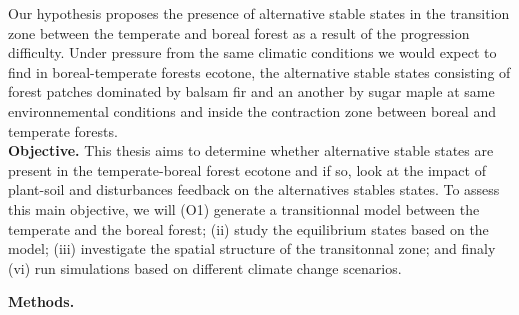 
Our hypothesis proposes the presence of alternative stable states in the transition zone between the temperate and boreal forest as a result of the progression difficulty. Under pressure from the same climatic conditions we would expect to find in boreal-temperate forests ecotone, the alternative stable states consisting of forest patches dominated by balsam fir and an another by sugar maple at same environnemental conditions and inside the contraction zone between boreal and temperate forests. \\

\textbf{Objective.} This thesis aims to determine whether alternative stable states are present in the temperate-boreal forest ecotone and if so, look at the impact of plant-soil and disturbances feedback on the alternatives stables states. To assess this main objective, we will (O1) generate a transitionnal model between the temperate and the boreal forest; (ii) study the equilibrium states based on the model; (iii) investigate the spatial structure of the transitonnal zone; and finaly (vi) run simulations based on different climate change scenarios. 

\textbf{Methods.}




\newpage



\newpage



